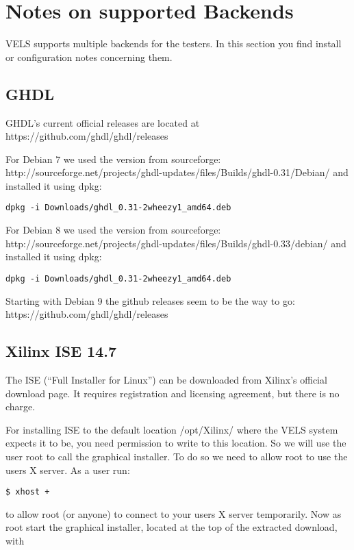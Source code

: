 \section{Notes on supported Backends} \label{backends}
VELS supports multiple backends for the testers. In this section you
find install or configuration notes concerning them.

\subsection{GHDL}
GHDL's current official releases are located at https://github.com/ghdl/ghdl/releases

For Debian 7 we used the version from sourceforge:
http://sourceforge.net/projects/ghdl-updates/files/Builds/ghdl-0.31/Debian/
and installed it using dpkg:

\begin{verbatim}
dpkg -i Downloads/ghdl_0.31-2wheezy1_amd64.deb
\end{verbatim}


For Debian 8 we used the version from sourceforge:
http://sourceforge.net/projects/ghdl-updates/files/Builds/ghdl-0.33/debian/
and installed it using dpkg:

\begin{verbatim}
dpkg -i Downloads/ghdl_0.31-2wheezy1_amd64.deb
\end{verbatim}

Starting with Debian 9 the github releases seem to be the way to go:
https://github.com/ghdl/ghdl/releases

\subsection{Xilinx ISE 14.7}\label{ISE-install}
The ISE (``Full Installer for Linux'') can be downloaded from Xilinx's official download page. It requires registration and licensing agreement, but there is no charge.

For installing ISE to the default location /opt/Xilinx/ where the VELS system expects it to be, you need permission to write to this location. So we will use the user root to call the graphical installer. To do so we need to allow root to use the users X server. As a user run:

\begin{verbatim}
$ xhost +
\end{verbatim}

to allow root (or anyone) to connect to your users X server temporarily. Now as root start the graphical installer, located at the top of the extracted download, with

